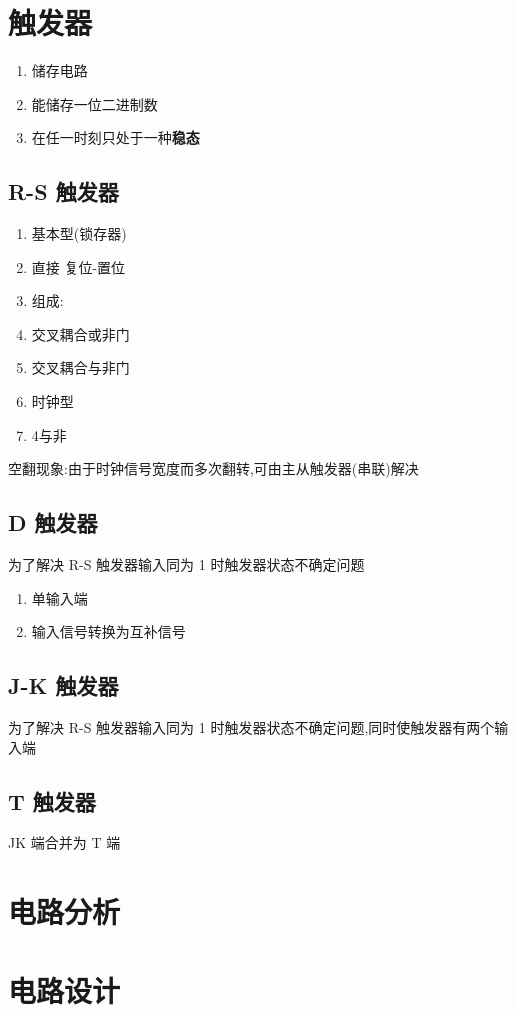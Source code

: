 \newpage

\section{触发器}

\begin{enumerate}
    \item 储存电路
    \item 能储存一位二进制数
    \item 在任一时刻只处于一种\textbf{稳态}
\end{enumerate}

\subsection{R-S 触发器}

\begin{enumerate}
    \item 基本型(锁存器)
    \item 直接 复位-置位
    \item 组成:
    \item 交叉耦合或非门
    \item 交叉耦合与非门
    \item 时钟型
    \item 4\*与非
\end{enumerate}

空翻现象:由于时钟信号宽度而多次翻转,可由主从触发器(串联)解决

\newpage

\subsection{D 触发器}

为了解决 R-S 触发器输入同为 1 时触发器状态不确定问题

\begin{enumerate}
    \item 单输入端
    \item 输入信号转换为互补信号
\end{enumerate}

\subsection{J-K 触发器}

为了解决 R-S 触发器输入同为 1 时触发器状态不确定问题,同时使触发器有两个输入端

\subsection{T 触发器}

JK 端合并为 T 端

\newpage

\section{电路分析}

\section{电路设计}

\newpage
